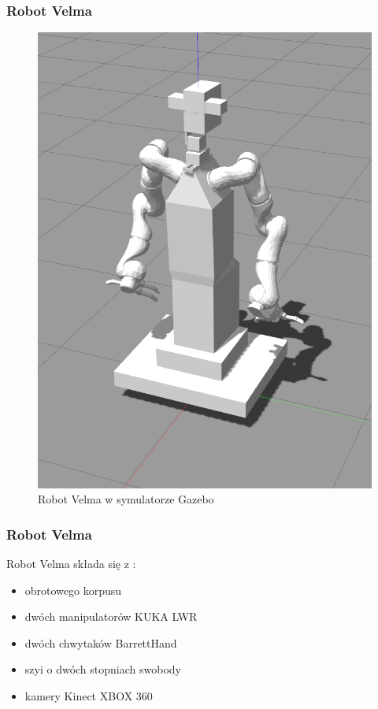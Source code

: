 \begin{frame}
\frametitle{Robot Velma}
\begin{figure}
\includegraphics[scale=0.20]{./images/velma_gz_cropped.png}
\caption{Robot Velma w symulatorze Gazebo}
\end{figure}
\end{frame}


\begin{frame}
\frametitle{Robot Velma}
Robot Velma składa się z \cite{docsVelma}:  
\begin{itemize}
	\item obrotowego korpusu
	\item dwóch manipulatorów KUKA LWR
	\item dwóch chwytaków BarrettHand
	\item szyi o dwóch stopniach swobody
	\item kamery Kinect XBOX 360
\end{itemize}
\end{frame}

